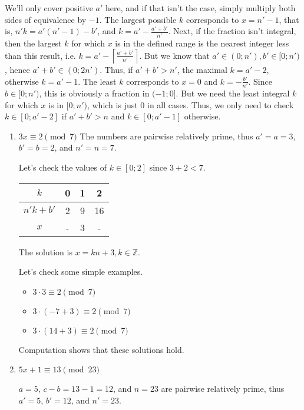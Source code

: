 \begin{description}
We'll only cover positive $a'$ here, and if that isn't the case, simply
multiply both sides of equivalence by $-1$. The largest possible $k$
corresponds to $x = n' - 1$, that is, $n' k = a' (n' - 1) - b'$, and $k = a' -
\frac {a' + b'} {n'}$. Next, if the fraction isn't integral, then the largest
$k$ for which $x$ is in the defined range is the nearest integer less than this
result, i.e. $k = a' - \left\lceil\frac{a' + b'}{n'}\right\rceil$. But we know
that $a' \in (0; n'), b' \in [0; n')$, hence $a' + b' \in (0; 2n')$. Thus, if
$a' + b' > n'$, the maximal $k = a' - 2$, otherwise $k = a' - 1$. The least $k$
corresponds to $x = 0$ and $k = - \frac {b'} {n'}$. Since $b \in [0; n')$, this
is obviously a fraction in $(-1; 0]$. But we need the least integral $k$ for
which $x$ is in $[0; n')$, which is just $0$ in all cases. Thus, we only need
to check $k \in [0; a' - 2]$ if $a' + b' > n$ and $k \in [0; a' - 1]$
otherwise.

\begin{enumerate}
\item $3x \equiv 2 \pmod 7$
The numbers are pairwise relatively prime, thus $a' = a = 3$, $b' = b = 2$, and
$n' = n = 7$.

Let's check the values of $k \in [0; 2]$ since $3 + 2 < 7$.

\begin{tabular}{|c|c c c|}
\hline
$k$         & 0  & 1  & 2  \\
\hline
$n' k + b'$ & 2  & 9  & 16 \\
$x$         & -  & 3  & -  \\
\hline
\end{tabular}

The solution is $x = kn + 3, k \in \mathbb Z$.

Let's check some simple examples.

\begin{itemize}
\item $3 \cdot 3 \equiv 2 \pmod 7$
\item $3 \cdot (-7 + 3) \equiv 2 \pmod 7$
\item $3 \cdot (14 + 3) \equiv 2 \pmod 7$
\end{itemize}

Computation shows that these solutions hold.

\item $5x + 1 \equiv 13 \pmod {23}$

$a = 5$, $c - b = 13 - 1 = 12$, and $n = 23$ are pairwise relatively prime,
thus $a' = 5$, $b' = 12$, and $n' = 23$.


\end{enumerate}
\end{description}
